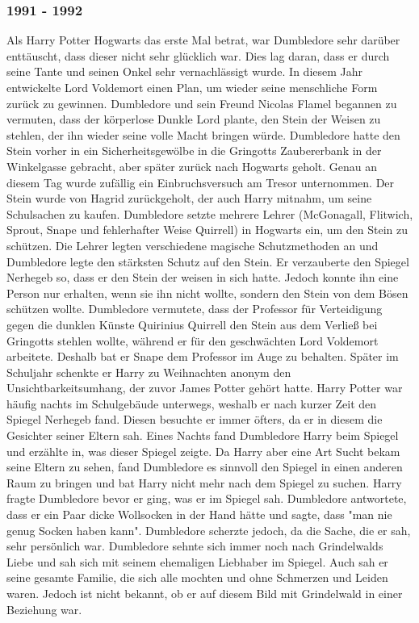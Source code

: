 \documentclass[a4paper, 10pt]{article}
\begin{document}
\subsubsection*{1991 - 1992}
Als Harry Potter Hogwarts das erste Mal betrat, war Dumbledore sehr darüber enttäuscht, dass dieser nicht sehr glücklich war. Dies lag daran, dass er durch seine Tante und seinen Onkel sehr vernachlässigt wurde. In diesem Jahr entwickelte Lord Voldemort einen Plan, um wieder seine menschliche Form zurück zu gewinnen. Dumbledore und sein Freund Nicolas Flamel begannen zu vermuten, dass der körperlose Dunkle Lord plante, den Stein der Weisen zu stehlen, der ihn wieder seine volle Macht bringen würde. Dumbledore hatte den Stein vorher in ein Sicherheitsgewölbe in die Gringotts Zaubererbank in der Winkelgasse gebracht, aber später zurück nach Hogwarts geholt. Genau an diesem Tag wurde zufällig ein Einbruchsversuch am Tresor unternommen. Der Stein wurde von Hagrid zurückgeholt, der auch Harry mitnahm, um seine Schulsachen zu kaufen.
\vspace{10pt}
\newline
{}  
Dumbledore setzte mehrere Lehrer (McGonagall, Flitwich, Sprout, Snape und fehlerhafter Weise Quirrell) in Hogwarts ein, um den Stein zu schützen. Die Lehrer legten verschiedene magische Schutzmethoden an und Dumbledore legte den stärksten
Schutz auf den Stein. Er verzauberte den Spiegel Nerhegeb so, dass er den Stein der weisen in sich hatte. Jedoch konnte ihn eine Person nur erhalten, wenn sie ihn nicht wollte, sondern den Stein von dem Bösen schützen wollte. Dumbledore vermutete, dass der Professor für Verteidigung gegen die dunklen Künste Quirinius Quirrell den Stein aus dem Verließ bei Gringotts stehlen wollte, während er für den geschwächten Lord Voldemort arbeitete. Deshalb bat er Snape dem Professor im Auge zu behalten. Später im Schuljahr schenkte er Harry zu Weihnachten anonym den Unsichtbarkeitsumhang, der zuvor James Potter gehört hatte.
\vspace{10pt}
\newline
{}  
Harry Potter war häufig nachts im Schulgebäude unterwegs, weshalb er nach kurzer Zeit den Spiegel Nerhegeb fand. Diesen besuchte er immer öfters, da er in diesem die Gesichter seiner Eltern sah. Eines Nachts fand Dumbledore Harry beim Spiegel und erzählte in, was dieser Spiegel zeigte. Da Harry aber eine Art Sucht bekam seine Eltern zu sehen, fand Dumbledore es sinnvoll den Spiegel in einen anderen Raum zu bringen und bat Harry nicht mehr nach dem Spiegel zu suchen. Harry fragte Dumbledore bevor er ging, was er im Spiegel sah. Dumbledore antwortete, dass er ein Paar dicke Wollsocken in der Hand hätte und sagte, dass "man nie genug Socken haben kann". Dumbledore scherzte jedoch, da die Sache, die er sah, sehr persönlich war. Dumbledore sehnte sich immer noch nach Grindelwalds Liebe und sah sich mit seinem ehemaligen Liebhaber im Spiegel. Auch sah er seine gesamte Familie, die sich alle mochten und ohne Schmerzen und Leiden waren. Jedoch ist nicht bekannt, ob er auf diesem Bild mit Grindelwald in einer Beziehung war.
\end{document}
